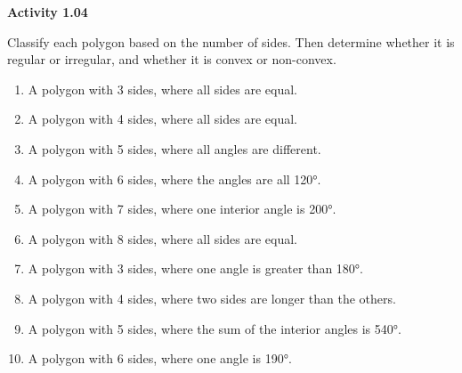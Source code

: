 \vspace{0.3ex}
\noindent\textbf{Activity 1.04}

\vspace{0.2ex}

Classify each polygon based on the number of sides. Then determine whether it is regular or irregular, and whether it is convex or non-convex.
\begin{enumerate}
    \item A polygon with 3 sides, where all sides are equal.
    \item A polygon with 4 sides, where all sides are equal.
    \item A polygon with 5 sides, where all angles are different.
    \item A polygon with 6 sides, where the angles are all 120°.
    \item A polygon with 7 sides, where one interior angle is 200°.
    \item A polygon with 8 sides, where all sides are equal.
    \item A polygon with 3 sides, where one angle is greater than 180°.
    \item A polygon with 4 sides, where two sides are longer than the others.
    \item A polygon with 5 sides, where the sum of the interior angles is 540°.
    \item A polygon with 6 sides, where one angle is 190°.
\end{enumerate}
